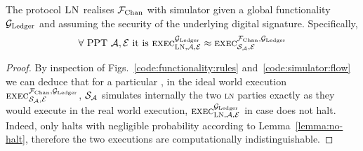 \begin{theorem}
  The protocol $\textsc{LN}$ realises $\mathcal{F}_{\mathrm{Chan}}$ with simulator \simulator given a
  global functionality $\mathcal{G}_{\mathrm{Ledger}}$ and assuming the security of the underlying
  digital signature. Specifically,
  \begin{gather*}
    \forall \text{ PPT } \mathcal{A}, \mathcal{E} \text{ it is }
    \textsc{exec}^{\mathcal{G}_{\mathrm{Ledger}}}_{\textsc{LN}, \mathcal{A}, \mathcal{E}} \approx
    \textsc{exec}^{\mathcal{F}_{\mathrm{Chan}}, \mathcal{G}_{\mathrm{Ledger}}}_{\mathcal{S}_{\mathcal{A}}, \mathcal{E}}
  \end{gather*}
\end{theorem}

\begin{proof}
  By inspection of Figs.~\ref{code:functionality:rules}
  and~\ref{code:simulator:flow} we can deduce that for a particular
  \environment, in the ideal world execution $\textsc{exec}^{\mathcal{F}_{\mathrm{Chan}},
  \mathcal{G}_{\mathrm{Ledger}}}_{\mathcal{S}_{\mathcal{A}}, \mathcal{E}}$, $\mathcal{S}_{\mathcal{A}}$
  simulates internally the two \textsc{ln} parties exactly as they would execute
  in the real world execution, $\textsc{exec}^{\mathcal{G}_{\mathrm{Ledger}}}_{\textsc{LN},
  \mathcal{A}, \mathcal{E}}$ in case \fchan does not halt. Indeed, \fchan only
  halts with negligible probability according to Lemma~\ref{lemma:no-halt},
  therefore the two executions are computationally indistinguishable.
\end{proof}

